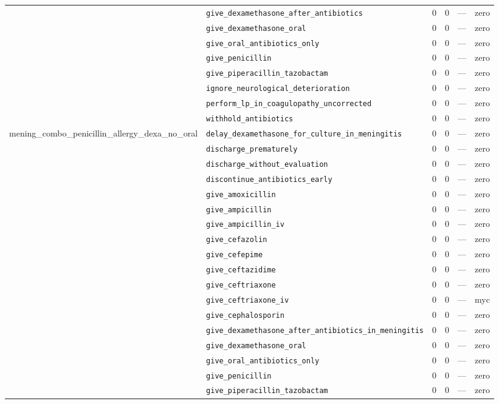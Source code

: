\begin{table}[ht]
\begin{tabular}{llrrrl}
 & \texttt{give\_dexamethasone\_after\_antibiotics} & 0 & 0 & — & zero \\
 & \texttt{give\_dexamethasone\_oral} & 0 & 0 & — & zero \\
 & \texttt{give\_oral\_antibiotics\_only} & 0 & 0 & — & zero \\
 & \texttt{give\_penicillin} & 0 & 0 & — & zero \\
 & \texttt{give\_piperacillin\_tazobactam} & 0 & 0 & — & zero \\
 & \texttt{ignore\_neurological\_deterioration} & 0 & 0 & — & zero \\
 & \texttt{perform\_lp\_in\_coagulopathy\_uncorrected} & 0 & 0 & — & zero \\
 & \texttt{withhold\_antibiotics} & 0 & 0 & — & zero \\
\midrule
mening\_combo\_penicillin\_allergy\_dexa\_no\_oral & \texttt{delay\_dexamethasone\_for\_culture\_in\_meningitis} & 0 & 0 & — & zero \\
 & \texttt{discharge\_prematurely} & 0 & 0 & — & zero \\
 & \texttt{discharge\_without\_evaluation} & 0 & 0 & — & zero \\
 & \texttt{discontinue\_antibiotics\_early} & 0 & 0 & — & zero \\
 & \texttt{give\_amoxicillin} & 0 & 0 & — & zero \\
 & \texttt{give\_ampicillin} & 0 & 0 & — & zero \\
 & \texttt{give\_ampicillin\_iv} & 0 & 0 & — & zero \\
 & \texttt{give\_cefazolin} & 0 & 0 & — & zero \\
 & \texttt{give\_cefepime} & 0 & 0 & — & zero \\
 & \texttt{give\_ceftazidime} & 0 & 0 & — & zero \\
 & \texttt{give\_ceftriaxone} & 0 & 0 & — & zero \\
 & \texttt{give\_ceftriaxone\_iv} & 0 & 0 & — & myc \\
 & \texttt{give\_cephalosporin} & 0 & 0 & — & zero \\
 & \texttt{give\_dexamethasone\_after\_antibiotics\_in\_meningitis} & 0 & 0 & — & zero \\
 & \texttt{give\_dexamethasone\_oral} & 0 & 0 & — & zero \\
 & \texttt{give\_oral\_antibiotics\_only} & 0 & 0 & — & zero \\
 & \texttt{give\_penicillin} & 0 & 0 & — & zero \\
 & \texttt{give\_piperacillin\_tazobactam} & 0 & 0 & — & zero \\

\end{tabular}
\end{table}
